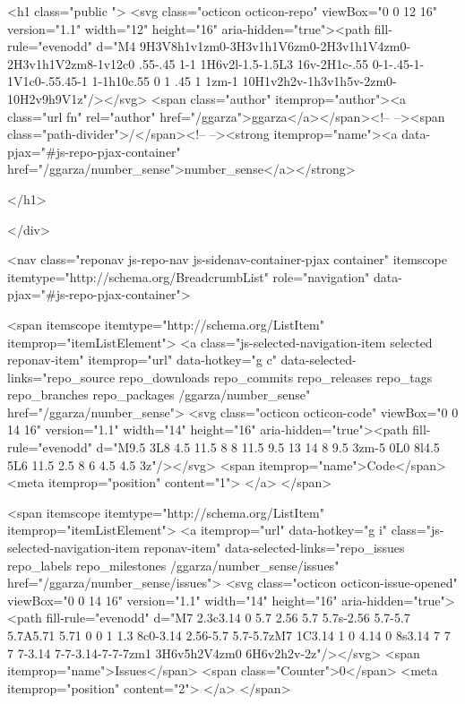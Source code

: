       <h1 class="public ">
  <svg class="octicon octicon-repo" viewBox="0 0 12 16" version="1.1" width="12" height="16" aria-hidden="true"><path fill-rule="evenodd" d="M4 9H3V8h1v1zm0-3H3v1h1V6zm0-2H3v1h1V4zm0-2H3v1h1V2zm8-1v12c0 .55-.45 1-1 1H6v2l-1.5-1.5L3 16v-2H1c-.55 0-1-.45-1-1V1c0-.55.45-1 1-1h10c.55 0 1 .45 1 1zm-1 10H1v2h2v-1h3v1h5v-2zm0-10H2v9h9V1z"/></svg>
  <span class="author" itemprop="author"><a class="url fn" rel="author" href="/ggarza">ggarza</a></span><!--
--><span class="path-divider">/</span><!--
--><strong itemprop="name"><a data-pjax="#js-repo-pjax-container" href="/ggarza/number_sense">number_sense</a></strong>

</h1>

    </div>
    
<nav class="reponav js-repo-nav js-sidenav-container-pjax container"
     itemscope
     itemtype="http://schema.org/BreadcrumbList"
     role="navigation"
     data-pjax="#js-repo-pjax-container">

  <span itemscope itemtype="http://schema.org/ListItem" itemprop="itemListElement">
    <a class="js-selected-navigation-item selected reponav-item" itemprop="url" data-hotkey="g c" data-selected-links="repo_source repo_downloads repo_commits repo_releases repo_tags repo_branches repo_packages /ggarza/number_sense" href="/ggarza/number_sense">
      <svg class="octicon octicon-code" viewBox="0 0 14 16" version="1.1" width="14" height="16" aria-hidden="true"><path fill-rule="evenodd" d="M9.5 3L8 4.5 11.5 8 8 11.5 9.5 13 14 8 9.5 3zm-5 0L0 8l4.5 5L6 11.5 2.5 8 6 4.5 4.5 3z"/></svg>
      <span itemprop="name">Code</span>
      <meta itemprop="position" content="1">
</a>  </span>

    <span itemscope itemtype="http://schema.org/ListItem" itemprop="itemListElement">
      <a itemprop="url" data-hotkey="g i" class="js-selected-navigation-item reponav-item" data-selected-links="repo_issues repo_labels repo_milestones /ggarza/number_sense/issues" href="/ggarza/number_sense/issues">
        <svg class="octicon octicon-issue-opened" viewBox="0 0 14 16" version="1.1" width="14" height="16" aria-hidden="true"><path fill-rule="evenodd" d="M7 2.3c3.14 0 5.7 2.56 5.7 5.7s-2.56 5.7-5.7 5.7A5.71 5.71 0 0 1 1.3 8c0-3.14 2.56-5.7 5.7-5.7zM7 1C3.14 1 0 4.14 0 8s3.14 7 7 7 7-3.14 7-7-3.14-7-7-7zm1 3H6v5h2V4zm0 6H6v2h2v-2z"/></svg>
        <span itemprop="name">Issues</span>
        <span class="Counter">0</span>
        <meta itemprop="position" content="2">
</a>    </span>

